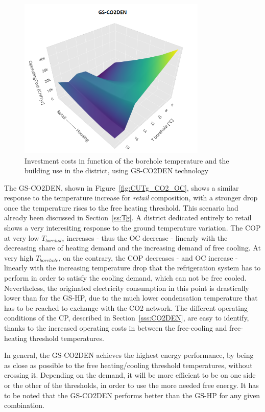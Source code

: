 \documentclass{article}
\begin{document}
\begin{figure}[htp]
	\centering
	\includegraphics[width=0.8\textwidth]{CUTg_SA_CO2_OC.png}
	\caption{Investment costs in function of the borehole temperature and the building use in the district, using GS-CO2DEN technology}
	\label{fig:CUTg_CO2_IC}
\end{figure}

The GS-CO2DEN, shown in Figure~\ref{fig:CUTg_CO2_OC}, shows a similar response to the temperature increase for \textit{retail} composition, with a stronger drop once the temperature rises to the free heating threshold. This scenario had already been discussed in Section~\ref{ss:Tg}. A district dedicated entirely to retail shows a very interesiting response to the ground temperature variation. The COP at very low $T_{borehole}$ increases - thus the OC decrease - linearly with the decreasing share of heating demand and the increasing demand of free cooling. At very high $T_{borehole}$, on the contrary, the COP decreases - and OC increase - linearly with the increasing temperature drop that the refrigeration system has to perform in order to satisfy the cooling demand, which can not be free cooled. Nevertheless, the originated electricity consumption in this point is drastically lower than for the GS-HP, due to the much lower condensation temperature that has to be reached to exchange with the CO2 network. The different operating conditions of the CP, described in Section~\ref{sss:CO2DEN}, are easy to identify, thanks to the increased operating costs in between the free-cooling and free-heating threshold temperatures.

In general, the GS-CO2DEN achieves the highest energy performance, by being as close as possible to the free heating/cooling threshold temperatures, without crossing it. Depending on the demand, it will be more efficient to be on one side or the other of the thresholds, in order to use the more needed free energy. It has to be noted that the GS-CO2DEN performs better than the GS-HP for any given combination. 
\end{document}
